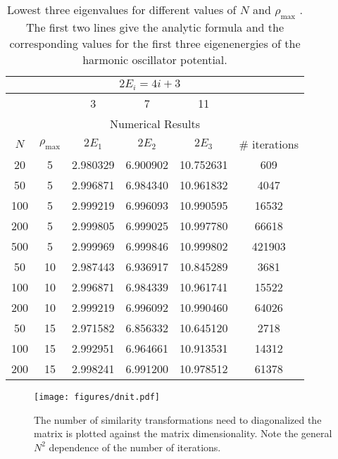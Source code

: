 \documentclass[10pt,showpacs,preprintnumbers,footinbib,amsmath,amssymb,aps,prl,twocolumn,groupedaddress,superscriptaddress,showkeys]{revtex4-1}
\newcommand{\rhomax}{
	\ensuremath{ \rho _{\mathrm{max}}} }
\begin{document}
{\begin{table}
\centering
	\begin{tabular}{ c c | c c c | c }
	 & & \multicolumn{3}{c}{$2 E_i = 4i + 3$} &\\
\hline
	 & & 3 & 7 & 11 & \\
\hline
	\multicolumn{6}{c}{Numerical Results}\\
\hline
	$N$ & \rhomax & $2E_1$ & $2E_2$ & $2E_3$ & \# iterations\\
\hline
	20  & 5  & 2.980329 & 6.900902 & 10.752631 & 609\\
	50  & 5  & 2.996871 & 6.984340 & 10.961832 & 4047\\
	100 & 5 & 2.999219 & 6.996093 & 10.990595 & 16532\\
	200 & 5 & 2.999805 & 6.999025 & 10.997780 & 66618\\
	500 & 5 & 2.999969 & 6.999846 & 10.999802 & 421903\\
\hline
	50   & 10 & 2.987443 & 6.936917 & 10.845289 & 3681\\
	100 & 10 & 2.996871 & 6.984339 & 10.961741 & 15522\\
	200 & 10 & 2.999219 & 6.996092 & 10.990460 & 64026\\
\hline
	50   & 15 & 2.971582 & 6.856332 & 10.645120 & 2718\\
	100 & 15 & 2.992951 & 6.964661 & 10.913531 & 14312\\
	200 & 15 & 2.998241 & 6.991200 & 10.978512 & 61378\\
	\end{tabular}
	\caption{Lowest three eigenvalues for different values of
	$N$ and \rhomax. The first two lines give the analytic
	formula and the corresponding values for the first three
	eigenenergies of the harmonic oscillator potential.}
	\label{tab:NRhoResults}
\end{table}

\begin{figure}
\centering
	\texttt{[image: figures/dnit.pdf]}
	\caption{The number of similarity transformations need to
	diagonalized the matrix is plotted against the matrix
	dimensionality. Note the general $N^2$ dependence of
	the number of iterations.}
	\label{fig:dnit}
\end{figure}

}
\end{document}
